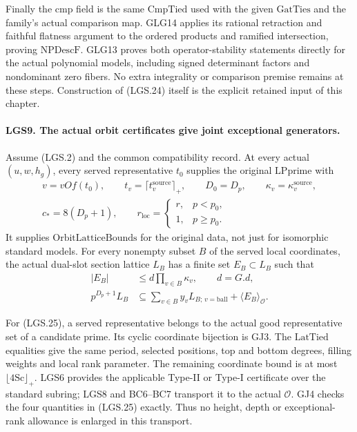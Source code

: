 \documentclass[11pt,a4paper]{article}
\numberwithin{equation}{section}
\theoremstyle{remark}\newtheorem{remark}[theorem]{Remark}
\begin{document}
Finally the \(\mathrm{cmp}\) field is the same
\(\mathrm{CmpTied}\) used with the given
\(\mathrm{GatTies}\) and the family's actual comparison
map.  GLG14 applies its rational retraction and faithful
flatness argument to the ordered products and ramified
intersection, proving \(\mathrm{NPDescF}\).
GLG13 proves both operator-stability statements directly
for the actual polynomial models, including signed
determinant factors and nondominant zero fibers.
No extra integrality or comparison premise remains at
these steps.  Construction of (LGS.24) itself is the
explicit retained input of this chapter.

\paragraph{LGS9. The actual orbit certificates give joint exceptional generators.}
\label{claim:LGS9}
Assume (LGS.2) and the common compatibility record.
At every actual \((u,w,h_g)\), every served representative
\(t_0\) supplies the original \(\mathrm{LPprime}\) with
\[
 \begin{gathered}
 v=vOf(t_0),\qquad t_v=\lceil t_v^{\mathrm{source}}\rceil_+,
 \qquad D_0=D_p,\qquad \kappa_v=\kappa_v^{\mathrm{source}},\\
 c_*=8(D_p+1),\qquad
 r_{\mathrm{loc}}=
       \begin{cases}r,&p<p_0,\\1,&p\ge p_0.\end{cases}
 \end{gathered}                                                   \tag{LGS.25}
\]
It supplies \(\mathrm{OrbitLatticeBounds}\) for the original
data, not just for isomorphic standard models.
For every nonempty subset \(B\) of the served local
coordinates, the actual dual-slot section lattice \(L_B\)
has a finite set \(E_B\subset L_B\) such that
\[
 \begin{split}
 |E_B|&\le d\prod_{v\in B}\kappa_v,\qquad d=G.d,\\
 p^{D_p+1}L_B
   &\subseteq
     \sum_{v\in B}y_v L_{B;\,v=\mathrm{ball}}
                         +\langle E_B\rangle_{\mathcal O}.
 \end{split}                                                     \tag{LGS.26}
\]

For (LGS.25), a served representative belongs to the actual
good representative set of a candidate prime.  Its cyclic
coordinate bijection is GJ3.  The \(\mathrm{LatTied}\)
equalities give the same period, selected positions,
top and bottom degrees, filling weights and local rank
parameter.  The remaining coordinate bound is at most
\(\lfloor4\mathrm{Sc}\rfloor_+\).
LGS6 provides the applicable Type-II or Type-I certificate
over the standard subring; LGS8 and BC6--BC7 transport it
to the actual \(\mathcal O\).  GJ4 checks the four
quantities in (LGS.25) exactly.  Thus no height, depth or
exceptional-rank allowance is enlarged in this transport.
\end{document}
